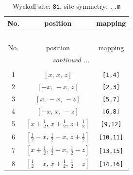 \documentclass[fleqn,8pt]{jsarticle}
\begin{document}
\begin{longtable}{ccc}
\caption{Wyckoff site: {\tt 8i}, site symmetry: {\tt ..m}}
 \\
 \hline \hline
No. & position & mapping \\ \hline \endfirsthead

\multicolumn{2}{l}{\tablename\ \thetable{}} \\
 \hline \hline
No. & position & mapping \\ \hline \endhead

 \hline \hline
\multicolumn{2}{r}{\footnotesize\it continued ...} \\ \endfoot

 \hline \hline
\multicolumn{2}{r}{} \\ \endlastfoot

1 & $\left[ x,\, x,\, z \right]$ & {\tt [1,4]} \\ \hline
2 & $\left[ - x,\, - x,\, z \right]$ & {\tt [2,3]} \\ \hline
3 & $\left[ x,\, - x,\, - z \right]$ & {\tt [5,7]} \\ \hline
4 & $\left[ - x,\, x,\, - z \right]$ & {\tt [6,8]} \\ \hline
5 & $\left[ x + \frac{1}{2},\, x + \frac{1}{2},\, z + \frac{1}{2} \right]$ & {\tt [9,12]} \\ \hline
6 & $\left[ \frac{1}{2} - x,\, \frac{1}{2} - x,\, z + \frac{1}{2} \right]$ & {\tt [10,11]} \\ \hline
7 & $\left[ x + \frac{1}{2},\, \frac{1}{2} - x,\, \frac{1}{2} - z \right]$ & {\tt [13,15]} \\ \hline
8 & $\left[ \frac{1}{2} - x,\, x + \frac{1}{2},\, \frac{1}{2} - z \right]$ & {\tt [14,16]} \\
\end{longtable}
\renewcommand{\arraystretch}{1.2}
\end{document}
